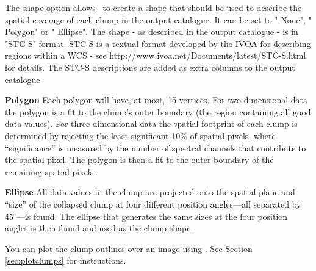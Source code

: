 \documentclass[11pt,oneside,chapters]{starlink}
\begin{document}
The shape option allows \findclumps\ to create a shape that should be 
used to describe the spatial coverage of each clump in the output 
catalogue. It can be set to " None", " Polygon" or " Ellipse". The shape
- as described in the output catalogue - is in "STC-S" format. STC-S is 
a textual format developed by the IVOA for describing regions within 
a WCS - see http://www.ivoa.net/Documents/latest/STC-S.html for details.
The STC-S descriptions are added as extra columns to the output catalogue.
\vspace{0.7cm}\\
\begin{aligndesc}
\item[\textbf{Polygon}]
Each polygon will have, at most, 15 vertices. For two-dimensional data
the polygon is a fit to the clump's outer boundary (the region
containing all good data values). For three-dimensional data the
spatial footprint of each clump is determined by rejecting the least
significant 10\% of spatial pixels, where ``significance'' is measured
by the number of spectral channels that contribute to the spatial
pixel. The polygon is then a fit to the outer boundary of the
remaining spatial pixels.
\vspace{0.7cm}\\
\item[\textbf{Ellipse}]
All data values in the clump are projected onto the spatial plane and
``size'' of the collapsed clump at four different position angles---all
separated by 45$^\circ$---is found. The ellipse that generates
the same sizes at the four position angles is then found and used as
the clump shape.
\end{aligndesc}

You can plot the clump outlines over an image using \gaia. See Section
\ref{sec:plotclumps} for instructions.
\end{document}
